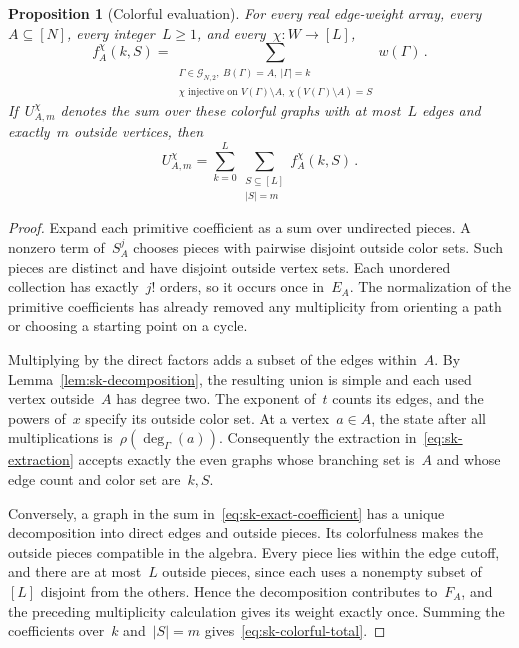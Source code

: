 \documentclass[10pt]{article}
\theoremstyle{plain}
\newtheorem{proposition}[theorem]{Proposition}
\theoremstyle{definition}
\theoremstyle{remark}
\begin{document}
\begin{proposition}[Colorful evaluation]\label{prop:sk-evaluation}
For every real edge-weight array, every~$A\subseteq[N]$, every integer~$L\ge1$, and every~$\chi:W\to[L]$,
\begin{equation}\label{eq:sk-exact-coefficient}
 f_A^\chi(k,S)=\sum_{\substack{\Gamma\in\mathcal G_{N,2},\ B(\Gamma)=A,\ |\Gamma|=k\\
 \chi\text{ injective on }V(\Gamma)\setminus A,\ \chi(V(\Gamma)\setminus A)=S}}w(\Gamma)\,.
\end{equation}
If~$U_{A,m}^\chi$ denotes the sum over these colorful graphs with at most~$L$ edges and exactly~$m$ outside vertices, then
\begin{equation}\label{eq:sk-colorful-total}
 U_{A,m}^\chi=\sum_{k=0}^{L}\sum_{\substack{S\subseteq[L]\\|S|=m}}f_A^\chi(k,S)\,.
\end{equation}
\end{proposition}
\begin{proof}
Expand each primitive coefficient as a sum over undirected pieces. A nonzero term of~$S_A^j$ chooses pieces with pairwise disjoint outside color sets. Such pieces are distinct and have disjoint outside vertex sets. Each unordered collection has exactly~$j!$ orders, so it occurs once in~$E_A$. The normalization of the primitive coefficients has already removed any multiplicity from orienting a path or choosing a starting point on a cycle.

Multiplying by the direct factors adds a subset of the edges within~$A$. By Lemma~\ref{lem:sk-decomposition}, the resulting union is simple and each used vertex outside~$A$ has degree two. The exponent of~$t$ counts its edges, and the powers of~$x$ specify its outside color set. At a vertex~$a\in A$, the state after all multiplications is~$\rho(\deg_\Gamma(a))$. Consequently the extraction in~\eqref{eq:sk-extraction} accepts exactly the even graphs whose branching set is~$A$ and whose edge count and color set are~$k,S$.

Conversely, a graph in the sum in~\eqref{eq:sk-exact-coefficient} has a unique decomposition into direct edges and outside pieces. Its colorfulness makes the outside pieces compatible in the algebra. Every piece lies within the edge cutoff, and there are at most~$L$ outside pieces, since each uses a nonempty subset of~$[L]$ disjoint from the others. Hence the decomposition contributes to~$F_A$, and the preceding multiplicity calculation gives its weight exactly once. Summing the coefficients over~$k$ and~$|S|=m$ gives~\eqref{eq:sk-colorful-total}.
\end{proof}
\end{document}
